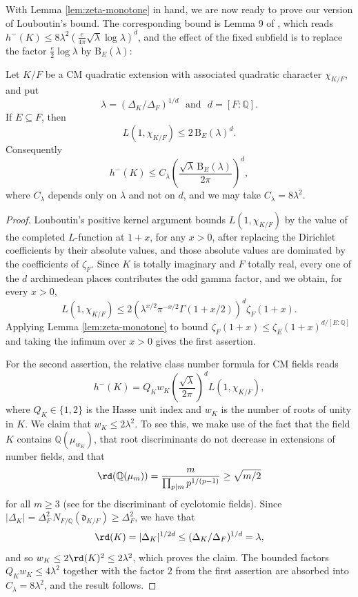 With Lemma \ref{lem:zeta-monotone} in hand, we are now ready to prove our version of Louboutin's bound.  The corresponding bound is Lemma 9 of \cite{Sawin}, which reads $h^-(K)\leq8\lambda^2\left(\frac{e}{4\pi}\sqrt\lambda\log\lambda\right)^d$, and the effect of the fixed subfield is to replace the factor $\frac{e}{2}\log\lambda$ by $\mathrm{B}_E(\lambda)$:
\begin{proposition}\label{prop:louboutin}
Let $K/F$ be a CM quadratic extension with associated quadratic character $\chi_{K/F}$, and put
\[
   \lambda=(\Delta_K/\Delta_F)^{1/d}\ \ \ \text{and}\ \ \ d=[F:\mathbb{Q}].
\]
If $E\subseteq F$, then
\[
   L(1,\chi_{K/F})\leq 2\,\mathrm{B}_E(\lambda)^d.
\]
Consequently
\begin{equation}\label{eq:hminus-bound}
   h^-(K)\leq C_\lambda\left(\frac{\sqrt\lambda\,\mathrm{B}_E(\lambda)}{2\pi}\right)^d,
\end{equation}
where $C_\lambda$ depends only on $\lambda$ and not on $d$, and we may take $C_\lambda=8\lambda^2$.
\end{proposition}

\begin{proof}
Louboutin's positive kernel argument \cite[Theorem 2]{Louboutin} bounds $L(1,\chi_{K/F})$ by the value of the completed $L$-function at $1+x$, for any $x>0$, after replacing the Dirichlet coefficients by their absolute values, and those absolute values are dominated by the coefficients of $\zeta_F$.  Since $K$ is totally imaginary and $F$ totally real, every one of the $d$ archimedean places contributes the odd gamma factor, and we obtain, for every $x>0$,
\[
   L(1,\chi_{K/F})\leq
   2\left(\lambda^{x/2}\pi^{-x/2}\Gamma(1+x/2)\right)^d\zeta_F(1+x).
\]
Applying Lemma \ref{lem:zeta-monotone} to bound $\zeta_F(1+x)\leq\zeta_E(1+x)^{d/[E:\mathbb{Q}]}$ and taking the infimum over $x>0$ gives the first assertion.

For the second assertion, the relative class number formula for CM fields reads
\[
   h^-(K)=Q_Kw_K\left(\frac{\sqrt\lambda}{2\pi}\right)^dL(1,\chi_{K/F}),
\]
where $Q_K\in\{1,2\}$ is the Hasse unit index and $w_K$ is the number of roots of unity in $K$.  We claim that $w_K\leq2\lambda^2$.  To see this, we make use of the fact that the field $K$ contains $\mathbb{Q}(\mu_{w_K})$, that root discriminants do not decrease in extensions of number fields, and that
\[
   \rd(\mathbb{Q}(\mu_m))=\frac{m}{\prod_{p\mid m}p^{1/(p-1)}}\geq \sqrt{m/2}
\]
for all $m\geq3$ (see \cite[Proposition 2.7]{Washington} for the discriminant of cyclotomic fields).  Since $|\Delta_K|=\Delta_F^2\,N_{F/\mathbb{Q}}(\mathfrak d_{K/F})\geq\Delta_F^2$, we have that
\[
   \rd(K)=|\Delta_K|^{1/2d}\leq(\Delta_K/\Delta_F)^{1/d}=\lambda,
\]
and so $w_K\leq2\rd(K)^2\leq2\lambda^2$, which proves the claim.  The bounded factors $Q_Kw_K\leq4\lambda^2$ together with the factor $2$ from the first assertion are absorbed into $C_\lambda=8\lambda^2$, and the result follows.
\end{proof}

